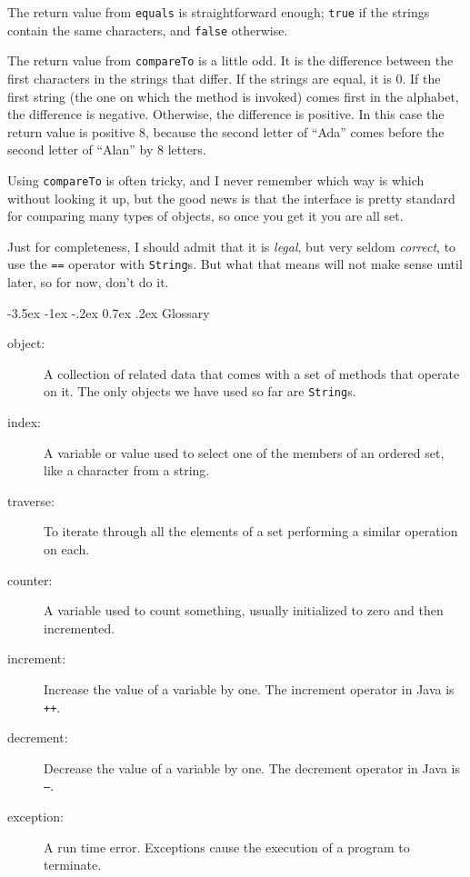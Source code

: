 \documentclass{book}
\makeatletter
\renewcommand{\section}{\@startsection 
    {section} {1} {0mm}%
    {-3.5ex \@plus -1ex \@minus -.2ex}%
    {0.7ex \@plus.2ex}%
    {\normalfont\Large\bfseries}}
\makeatother
\begin{document}
The return value from {\tt equals} is straightforward enough;
{\tt true} if the strings contain the same characters, and
{\tt false} otherwise.

The return value from {\tt compareTo} is a little odd.  It is
the difference between the first characters in the strings
that differ.  If the strings are equal, it is 0.  If the
first string (the one on which the method is invoked) comes
first in the alphabet, the difference is negative.  Otherwise,
the difference is positive.  In this case the return value
is positive 8, because the second letter of ``Ada'' comes
before the second letter of ``Alan'' by 8 letters.

Using {\tt compareTo} is often tricky, and I never remember
which way is which without looking it up, but the good news
is that the interface is pretty standard for comparing many
types of objects, so once you get it you are all set.

Just for completeness, I should admit that it is
{\em legal}, but very seldom {\em correct}, to use the {\tt ==}
operator with {\tt String}s.  But what that means will not make
sense until later, so for now, don't do it.

\section{Glossary}

\begin{description}

\item[object:] A collection of related data that comes with a set of
methods that operate on it.  The only objects we have used so far are
{\tt String}s.

\item[index:]  A variable or value used to select one of the
members of an ordered set, like a character from a string.

\item[traverse:]  To iterate through all the elements of a set
performing a similar operation on each.

\item[counter:]  A variable used to count something, usually
initialized to zero and then incremented.

\item[increment:]  Increase the value of a variable by one.
The increment operator in Java is {\tt ++}.

\item[decrement:]  Decrease the value of a variable by one.
The decrement operator in Java is {\tt --}.

\item[exception:]  A run time error.  Exceptions cause the execution
of a program to terminate.


\end{description}
\end{document}
